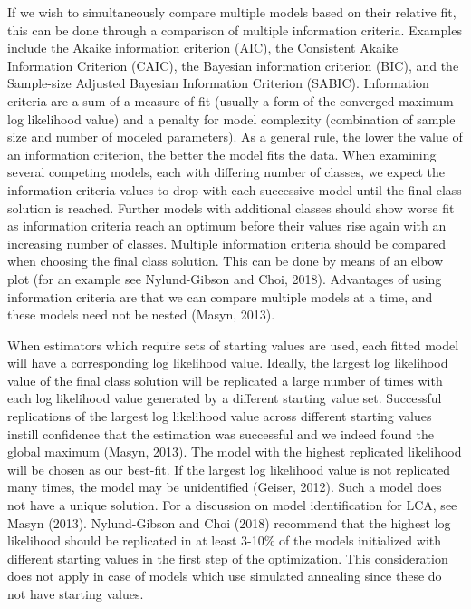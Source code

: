 \documentclass[
  ,man]{apa6}
\begin{document}
If we wish to simultaneously compare multiple models based on their relative fit,
this can be done through a comparison of multiple information criteria.
Examples include the Akaike information criterion (AIC), the Consistent Akaike Information Criterion (CAIC),
the Bayesian information criterion (BIC), and the Sample-size Adjusted Bayesian Information Criterion (SABIC).
Information criteria are a sum of a measure of fit (usually a form of the converged maximum log likelihood value)
and a penalty for model complexity (combination of sample size and number of modeled parameters).
As a general rule, the lower the value of an information criterion, the better the model fits the data.
When examining several competing models, each with differing number of classes,
we expect the information criteria values to drop with each successive model until the final class solution is reached.
Further models with additional classes should show worse fit as information criteria reach an optimum
before their values rise again with an increasing number of classes.
Multiple information criteria should be compared when choosing the final class solution.
This can be done by means of an elbow plot (for an example see Nylund-Gibson and Choi, 2018).
Advantages of using information criteria are that we can compare multiple models at a time,
and these models need not be nested (Masyn, 2013).

When estimators which require sets of starting values are used,
each fitted model will have a corresponding log likelihood value.
Ideally, the largest log likelihood value of the final class solution will be replicated a large number of times
with each log likelihood value generated by a different starting value set.
Successful replications of the largest log likelihood value across different starting values
instill confidence that the estimation was successful and we indeed found the global maximum (Masyn, 2013).
The model with the highest replicated likelihood will be chosen as our best-fit.
If the largest log likelihood value is not replicated many times, the model may be unidentified (Geiser, 2012).
Such a model does not have a unique solution. For a discussion on model identification for LCA, see Masyn (2013).
Nylund-Gibson and Choi (2018) recommend that the highest log likelihood should be replicated
in at least 3-10\% of the models initialized with different starting values in the first step of the optimization.
This consideration does not apply in case of models which use simulated annealing since these do not have starting values.
\end{document}
